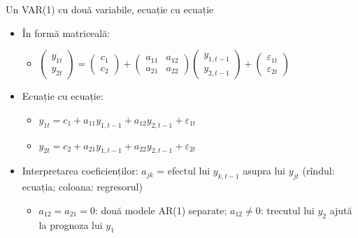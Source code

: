 \begin{frame}{Un VAR(1) cu două variabile, ecuație cu ecuație}
\itemsize{\small}
\begin{itemize}
    \item În formă matriceală:
    \begin{itemize}
        \item $\begin{pmatrix} y_{1t} \\ y_{2t} \end{pmatrix} = \begin{pmatrix} c_1 \\ c_2 \end{pmatrix} + \begin{pmatrix} a_{11} & a_{12} \\ a_{21} & a_{22} \end{pmatrix}\begin{pmatrix} y_{1,t-1} \\ y_{2,t-1} \end{pmatrix} + \begin{pmatrix} \varepsilon_{1t} \\ \varepsilon_{2t} \end{pmatrix}$
    \end{itemize}
    \item Ecuație cu ecuație:
    \begin{itemize}
        \item $y_{1t} = c_1 + a_{11}y_{1,t-1} + a_{12}y_{2,t-1} + \varepsilon_{1t}$
        \item $y_{2t} = c_2 + a_{21}y_{1,t-1} + a_{22}y_{2,t-1} + \varepsilon_{2t}$
    \end{itemize}
    \item Interpretarea coeficienților: $a_{jk}$ = efectul lui $y_{k,t-1}$ asupra lui $y_{jt}$ (rîndul: ecuația; coloana: regresorul)
    \begin{itemize}
        \item $a_{12} = a_{21} = 0$: două modele AR(1) separate; $a_{12} \ne 0$: trecutul lui $y_2$ ajută la prognoza lui $y_1$
    \end{itemize}
\end{itemize}
\end{frame}

